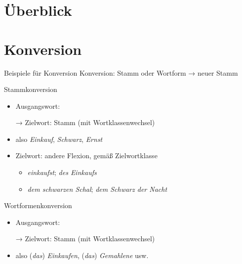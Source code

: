 \section{Überblick}

\section{Konversion}

\begin{frame}
  {Beispiele für Konversion}
  \pause
  Konversion: \alert{Stamm oder Wortform → neuer Stamm}
  \Halbzeile
  \pause
  \begin{exe}
    \pause
    \pause
    \pause
    \pause
    \pause
    \pause
    \pause
  \end{exe}
\end{frame}

\begin{frame}
  {Stammkonversion}
  \pause
  \begin{itemize}[<+->]
    \item Ausgangswort: 
    \item[→] Zielwort: Stamm \alert{(mit Wortklassenwechsel)}
      \Halbzeile
    \item also \textit{Einkauf}, \textit{Schwarz}, \textit{Ernst}
      \Halbzeile
    \item Zielwort: andere Flexion, gemäß Zielwortklasse
      \begin{itemize}[<+->]
        \item \textit{einkaufst}; \textit{des Einkaufs}
        \item \textit{dem schwarzen Schal}; \textit{dem Schwarz der Nacht}
      \end{itemize}
  \end{itemize}
\end{frame}

\begin{frame}
  {Wortformenkonversion}
  \pause
  \begin{itemize}[<+->]
    \item Ausgangswort: 
    \item[→] Zielwort: Stamm \alert{(mit Wortklassenwechsel)}
      \Halbzeile
    \item also (\textit{das}) \textit{Einkaufen}, (\textit{das}) \textit{Gemahlene} usw.
  \end{itemize}
\end{frame}

